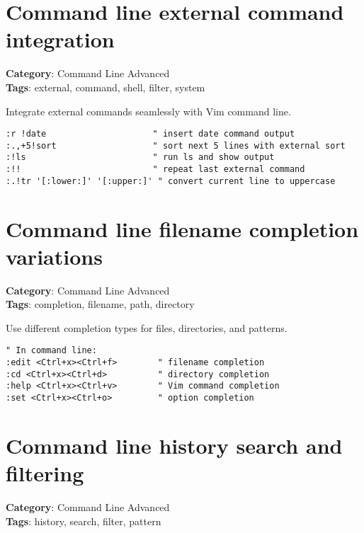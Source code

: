 {{{\section{Command line external command integration}

\textbf{Category}: Command Line Advanced\\ \textbf{Tags}: external, command, shell, filter, system
\vspace{0.5cm}

Integrate external commands seamlessly with Vim command line.

\begin{Exa*}{}
\begin{Verbatim}[fontsize=\footnotesize, breaklines, breakanywhere]
:r !date                     " insert date command output
:.,+5!sort                   " sort next 5 lines with external sort
:!ls                         " run ls and show output
:!!                          " repeat last external command
:.!tr '[:lower:]' '[:upper:]' " convert current line to uppercase
\end{Verbatim}
\end{Exa*}

\section{Command line filename completion variations}

\textbf{Category}: Command Line Advanced\\ \textbf{Tags}: completion, filename, path, directory
\vspace{0.5cm}

Use different completion types for files, directories, and patterns.

\begin{Exa*}{}
\begin{Verbatim}[fontsize=\footnotesize, breaklines, breakanywhere]
" In command line:
:edit <Ctrl+x><Ctrl+f>        " filename completion
:cd <Ctrl+x><Ctrl+d>          " directory completion  
:help <Ctrl+x><Ctrl+v>        " Vim command completion
:set <Ctrl+x><Ctrl+o>         " option completion
\end{Verbatim}
\end{Exa*}

\section{Command line history search and filtering}

\textbf{Category}: Command Line Advanced\\ \textbf{Tags}: history, search, filter, pattern
\vspace{0.5cm}

}}}
